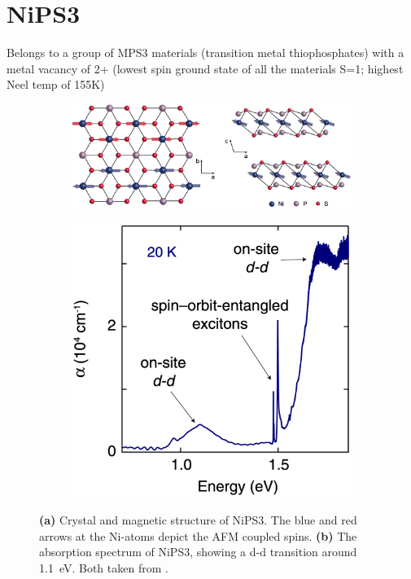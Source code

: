 \section{NiPS3}
Belongs to a group of MPS3 materials (transition metal thiophosphates) with a metal vacancy of 2+ (lowest spin ground state of all the materials S=1; highest Neel temp of 155K)
\begin{figure}[ht]
    \centering
    \begin{subfigure}[c]{0.65\textwidth}
        \includegraphics[width=\textwidth]{pictures/12.png}
        \caption{}
        \label{fig:12}
    \end{subfigure}
    \hspace{0.3cm}
    \begin{subfigure}[c]{0.3\textwidth}
        \includegraphics[width=\textwidth]{pictures/8.png}
        \caption{}
        \label{fig:8}
    \end{subfigure}
    \vspace{-0.1cm}
    \caption{\textbf{(a)} Crystal and magnetic structure of NiPS3. The blue and red arrows at the Ni-atoms depict the AFM coupled spins. \textbf{(b)} The absorption spectrum of NiPS3, showing a d-d transition around \qty{1.1}{eV}. Both taken from .}
\end{figure}
\FloatBarrier


